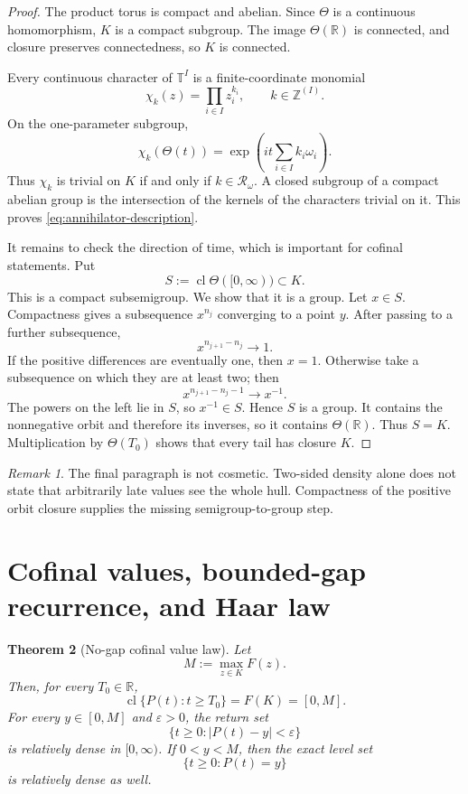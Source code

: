\documentclass[11pt]{article}
\newtheorem{theorem}{Theorem}[section]
\theoremstyle{remark}
\newtheorem{remark}[theorem]{Remark}
\newcommand{\T}{\mathbb T}
\newcommand{\R}{\mathbb R}
\newcommand{\Z}{\mathbb Z}
\newcommand{\cl}{\operatorname{cl}}
\newcommand{\Rel}{\mathcal R}
\begin{document}
\begin{proof}
The product torus is compact and abelian.  Since $\Theta$ is a continuous homomorphism, $K$ is a
compact subgroup.  The image $\Theta(\R)$ is connected, and closure preserves connectedness, so
$K$ is connected.

Every continuous character of $\T^I$ is a finite-coordinate monomial
\[
 \chi_k(z)=\prod_{i\in I}z_i^{k_i},\qquad k\in\Z^{(I)}.
\]
On the one-parameter subgroup,
\[
 \chi_k(\Theta(t))=
 \exp\left(it\sum_{i\in I}k_i\omega_i\right).
\]
Thus $\chi_k$ is trivial on $K$ if and only if $k\in\Rel_\omega$.  A closed subgroup of a compact
abelian group is the intersection of the kernels of the characters trivial on it.  This proves
\eqref{eq:annihilator-description}.

It remains to check the direction of time, which is important for cofinal statements.  Put
\[
 S:=\cl\Theta([0,\infty))\subset K.
\]
This is a compact subsemigroup.  We show that it is a group.  Let $x\in S$.  Compactness gives a
subsequence $x^{n_j}$ converging to a point $y$.  After passing to a further subsequence,
\[
 x^{n_{j+1}-n_j}\longrightarrow 1.
\]
If the positive differences are eventually one, then $x=1$.  Otherwise take a subsequence on which
they are at least two; then
\[
 x^{n_{j+1}-n_j-1}\longrightarrow x^{-1}.
\]
The powers on the left lie in $S$, so $x^{-1}\in S$.  Hence $S$ is a group.  It contains the
nonnegative orbit and therefore its inverses, so it contains $\Theta(\R)$.  Thus $S=K$.
Multiplication by $\Theta(T_0)$ shows that every tail has closure $K$.
\end{proof}

\begin{remark}
The final paragraph is not cosmetic.  Two-sided density alone does not state that arbitrarily late
values see the whole hull.  Compactness of the positive orbit closure supplies the missing
semigroup-to-group step.
\end{remark}

\section{Cofinal values, bounded-gap recurrence, and Haar law}\label{sec:recurrence}

\begin{theorem}[No-gap cofinal value law]\label{thm:no-gap}
Let
\begin{equation}\label{eq:M-def}
 M:=\max_{z\in K}F(z).
\end{equation}
Then, for every $T_0\in\R$,
\begin{equation}\label{eq:tail-closure}
 \cl\{P(t):t\geq T_0\}=F(K)=[0,M].
\end{equation}
For every $y\in[0,M]$ and $\varepsilon>0$, the return set
\begin{equation}\label{eq:approx-return}
 \{t\geq0:|P(t)-y|<\varepsilon\}
\end{equation}
is relatively dense in $[0,\infty)$.  If $0<y<M$, then the exact level set
\begin{equation}\label{eq:exact-level}
 \{t\geq0:P(t)=y\}
\end{equation}
is relatively dense as well.
\end{theorem}
\end{document}
